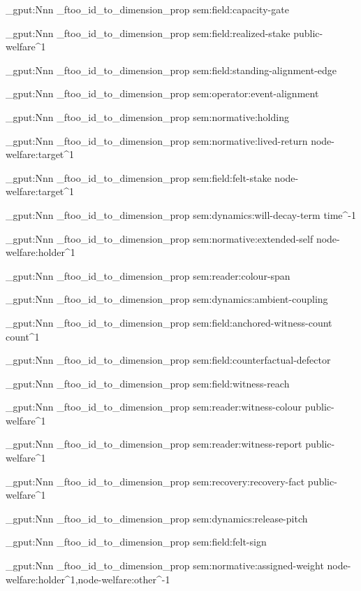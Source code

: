 \prop_gput:Nnn \g_ftoo_id_to_dimension_prop { sem:field:capacity-gate } {  }

\prop_gput:Nnn \g_ftoo_id_to_dimension_prop { sem:field:realized-stake } { public-welfare^1 }

\prop_gput:Nnn \g_ftoo_id_to_dimension_prop { sem:field:standing-alignment-edge } {  }

\prop_gput:Nnn \g_ftoo_id_to_dimension_prop { sem:operator:event-alignment } {  }

\prop_gput:Nnn \g_ftoo_id_to_dimension_prop { sem:normative:holding } {  }

\prop_gput:Nnn \g_ftoo_id_to_dimension_prop { sem:normative:lived-return } { node-welfare:target^1 }

\prop_gput:Nnn \g_ftoo_id_to_dimension_prop { sem:field:felt-stake } { node-welfare:target^1 }

\prop_gput:Nnn \g_ftoo_id_to_dimension_prop { sem:dynamics:will-decay-term } { time^-1 }

\prop_gput:Nnn \g_ftoo_id_to_dimension_prop { sem:normative:extended-self } { node-welfare:holder^1 }

\prop_gput:Nnn \g_ftoo_id_to_dimension_prop { sem:reader:colour-span } {  }

\prop_gput:Nnn \g_ftoo_id_to_dimension_prop { sem:dynamics:ambient-coupling } {  }

\prop_gput:Nnn \g_ftoo_id_to_dimension_prop { sem:field:anchored-witness-count } { count^1 }

\prop_gput:Nnn \g_ftoo_id_to_dimension_prop { sem:field:counterfactual-defector } {  }

\prop_gput:Nnn \g_ftoo_id_to_dimension_prop { sem:field:witness-reach } {  }

\prop_gput:Nnn \g_ftoo_id_to_dimension_prop { sem:reader:witness-colour } { public-welfare^1 }

\prop_gput:Nnn \g_ftoo_id_to_dimension_prop { sem:reader:witness-report } { public-welfare^1 }

\prop_gput:Nnn \g_ftoo_id_to_dimension_prop { sem:recovery:recovery-fact } { public-welfare^1 }

\prop_gput:Nnn \g_ftoo_id_to_dimension_prop { sem:dynamics:release-pitch } {  }

\prop_gput:Nnn \g_ftoo_id_to_dimension_prop { sem:field:felt-sign } {  }

\prop_gput:Nnn \g_ftoo_id_to_dimension_prop { sem:normative:assigned-weight } { node-welfare:holder^1,node-welfare:other^-1 }

